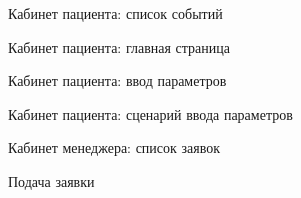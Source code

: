 \newpage \begin{figure}[h]
\caption{Кабинет пациента: список событий}
\label{app:patient_cabinet_events}
\end{figure}

\newpage \begin{figure}[h]
\caption{Кабинет пациента: главная страница}
\label{app:patient_cabinet_main}
\end{figure}

\newpage \begin{figure}[h]
\caption{Кабинет пациента: ввод параметров}
\label{app:patient_cabinet_parameters}
\end{figure}

\newpage \begin{figure}[h]
\caption{Кабинет пациента: сценарий ввода параметров}
\label{app:enter_parameter}
\end{figure}

\newpage \begin{figure}[h]
\caption{Кабинет менеджера: список заявок}
\label{app:manager_cabinet_bid}
\end{figure}

\newpage \begin{figure}[h]
\caption{Подача заявки}
\label{app:bid_form}
\end{figure}

